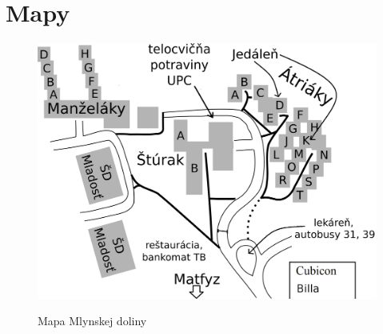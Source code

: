 \chapter{Mapy}

\begin{figure}[h]
\begin{centering}
\includegraphics[width=1\textwidth]{obrazky/mapa-horiz_w}\label{fig:mapa-mlynov}
\par\end{centering}

\protect\caption{Mapa Mlynskej doliny}
\end{figure}

